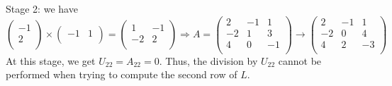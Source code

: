 \documentclass[paper=a4, fontsize=11pt]{scrartcl} %
\numberwithin{equation}{section} %
\numberwithin{figure}{section} %
\numberwithin{table}{section} %
\begin{document}
Stage 2: we have
$$
\begin{pmatrix}
-1  \\
2 \\
\end{pmatrix}
\times
\begin{pmatrix}
-1 & 1 \\
\end{pmatrix}
=
\begin{pmatrix}
1 & -1\\
-2 & 2 \\
\end{pmatrix}
\Rightarrow
A = \begin{pmatrix}
2 & -1 & 1 \\
-2 & 1 & 3 \\
4 & 0 & -1 \\
\end{pmatrix}
\rightarrow
\begin{pmatrix}
2 & -1 & 1 \\
-2 & \boxed{0} & 4 \\
4 & 2 & -3 \\
\end{pmatrix}
$$
At this stage, we get $U_{22} = A_{22}=0$. Thus, the division by $U_{22}$ cannot be performed when trying to compute
the second row of $L$.\\
\end{document}
